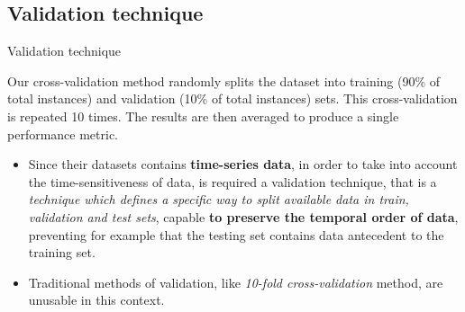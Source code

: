 \documentclass[13.5pt]{beamer}
\begin{document}
\subsection{Validation technique}
\begin{frame}{Validation technique}

\begin{quoting}[font=itshape, begintext={``}, endtext={''\\\textbf{\citet{ITPAReport}}}]
\justifying
Our cross-validation method randomly splits the dataset into training (90\% of total instances) and validation (10\% of total instances) sets. This cross-validation is repeated 10 times. The results are then averaged to produce a single performance metric. 
\end{quoting}

\begin{itemize}
\justifying
\item Since their datasets contains \textbf{time-series data}, in order to take into account the time-sensitiveness of data, is required a validation technique, that is a \textit{technique which defines a specific way to split available data in train, validation and test sets}, capable \textbf{to preserve the temporal order of data}, preventing for example that the testing set contains data antecedent to the training set.

\item Traditional methods of validation, like \textit{10-fold cross-validation} method, are unusable in this context.
\end{itemize}

\end{frame} 
\end{document}
